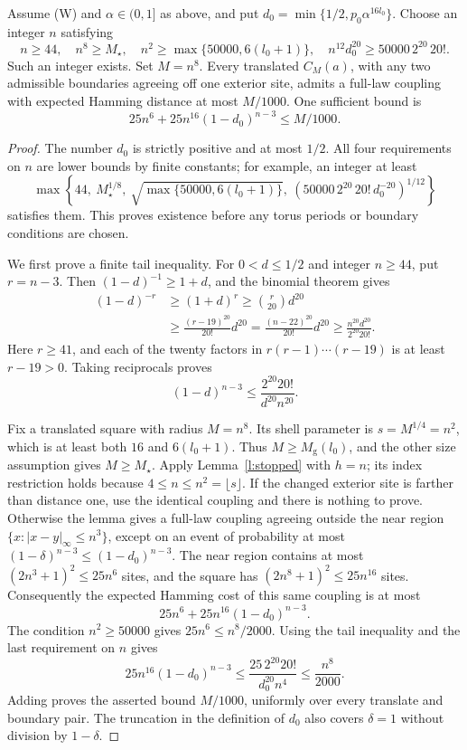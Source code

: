 \begin{lemma}\label{l:hamming}
Assume (W) and \(\alpha\in(0,1]\) as above, and put
\(d_0=\min\{1/2,p_0\alpha^{16l_0}\}\).
Choose an integer \(n\) satisfying
\[
 n\ge44,\quad n^8\ge M_\star,\quad
 n^2\ge\max\{50000,6(l_0+1)\},\quad
 n^{12}d_0^{20}\ge50000\,2^{20}\,20!.
\]
Such an integer exists. Set \(M=n^8\).
Every translated \(C_M(a)\), with any two admissible boundaries
agreeing off one exterior site, admits a full-law coupling with
expected Hamming distance at most \(M/1000\).
One sufficient bound is
\[
 25n^6+25n^{16}(1-d_0)^{n-3}\le M/1000.
\]
\end{lemma}

\begin{proof}
The number \(d_0\) is strictly positive and at most \(1/2\).
All four requirements on \(n\) are lower bounds by finite constants;
for example, an integer at least
\[
 \max\left\{44,\ M_\star^{1/8},\
       \sqrt{\max\{50000,6(l_0+1)\}},\
       \left(50000\,2^{20}\,20!\,d_0^{-20}\right)^{1/12}\right\}
\]
satisfies them.  This proves existence before any torus periods or
boundary conditions are chosen.

We first prove a finite tail inequality.  For \(0<d\le1/2\) and
integer \(n\ge44\), put \(r=n-3\).  Then
\((1-d)^{-1}\ge1+d\), and the binomial theorem gives
\[
 \begin{split}
 (1-d)^{-r}
 &\ge(1+d)^r\ge\binom r{20}d^{20}\\
 &\ge\frac{(r-19)^{20}}{20!}d^{20}
   =\frac{(n-22)^{20}}{20!}d^{20}
   \ge\frac{n^{20}d^{20}}{2^{20}20!}.
 \end{split}
\]
Here \(r\ge41\), and each of the twenty factors in
\(r(r-1)\cdots(r-19)\) is at least \(r-19>0\).
Taking reciprocals proves
\[
 (1-d)^{n-3}\le\frac{2^{20}20!}{d^{20}n^{20}}.
\]

Fix a translated square with radius \(M=n^8\).  Its shell parameter
is \(s=M^{1/4}=n^2\), which is at least both \(16\) and
\(6(l_0+1)\).  Thus \(M\ge M_{\mathrm g}(l_0)\), and the other
size assumption gives \(M\ge M_\star\).
Apply Lemma~\ref{l:stopped} with \(h=n\); its index restriction
holds because \(4\le n\le n^2=\lfloor s\rfloor\).
If the changed exterior site is farther than distance one, use the
identical coupling and there is nothing to prove.  Otherwise the
lemma gives a full-law coupling agreeing outside the near region
\(\{x:|x-y|_\infty\le n^3\}\), except on an event of probability
at most \((1-\delta)^{n-3}\le(1-d_0)^{n-3}\).
The near region contains at most
\((2n^3+1)^2\le25n^6\) sites, and the square has
\((2n^8+1)^2\le25n^{16}\) sites.  Consequently the expected
Hamming cost of this same coupling is at most
\[
 25n^6+25n^{16}(1-d_0)^{n-3}.
\]
The condition \(n^2\ge50000\) gives \(25n^6\le n^8/2000\).
Using the tail inequality and the last requirement on \(n\) gives
\[
 25n^{16}(1-d_0)^{n-3}
   \le\frac{25\,2^{20}20!}{d_0^{20}n^4}
   \le\frac{n^8}{2000}.
\]
Adding proves the asserted bound \(M/1000\), uniformly over every
translate and boundary pair.  The truncation in the definition of
\(d_0\) also covers \(\delta=1\) without division by \(1-\delta\).
\end{proof}


